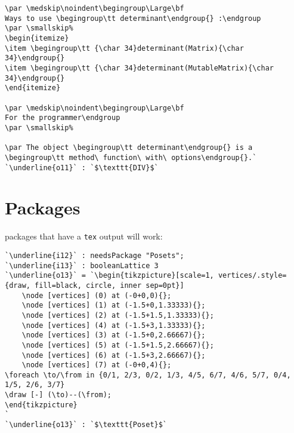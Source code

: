 \documentclass[12pt,a4paper]{amsart}
\begin{document}
\begin{lstlisting}[language=Macaulay2]
\par \medskip\noindent\begingroup\Large\bf
Ways to use \begingroup\tt determinant\endgroup{} :\endgroup
\par \smallskip%
\begin{itemize}
\item \begingroup\tt {\char 34}determinant(Matrix){\char 34}\endgroup{}
\item \begingroup\tt {\char 34}determinant(MutableMatrix){\char 34}\endgroup{}
\end{itemize}

\par \medskip\noindent\begingroup\Large\bf
For the programmer\endgroup
\par \smallskip%

\par The object \begingroup\tt determinant\endgroup{} is a \begingroup\tt method\ function\ with\ options\endgroup{}.`
`\underline{o11}` : `$\texttt{DIV}$`\end{lstlisting}

\section{Packages}
packages that have a {\tt tex} output will work:
\begin{lstlisting}[language=Macaulay2]
`\underline{i12}` : needsPackage "Posets";
`\underline{i13}` : booleanLattice 3
`\underline{o13}` = `\begin{tikzpicture}[scale=1, vertices/.style={draw, fill=black, circle, inner sep=0pt}]
	\node [vertices] (0) at (-0+0,0){};
	\node [vertices] (1) at (-1.5+0,1.33333){};
	\node [vertices] (2) at (-1.5+1.5,1.33333){};
	\node [vertices] (4) at (-1.5+3,1.33333){};
	\node [vertices] (3) at (-1.5+0,2.66667){};
	\node [vertices] (5) at (-1.5+1.5,2.66667){};
	\node [vertices] (6) at (-1.5+3,2.66667){};
	\node [vertices] (7) at (-0+0,4){};
\foreach \to/\from in {0/1, 2/3, 0/2, 1/3, 4/5, 6/7, 4/6, 5/7, 0/4, 1/5, 2/6, 3/7}
\draw [-] (\to)--(\from);
\end{tikzpicture}
`
`\underline{o13}` : `$\texttt{Poset}$`\end{lstlisting}
\end{document}
